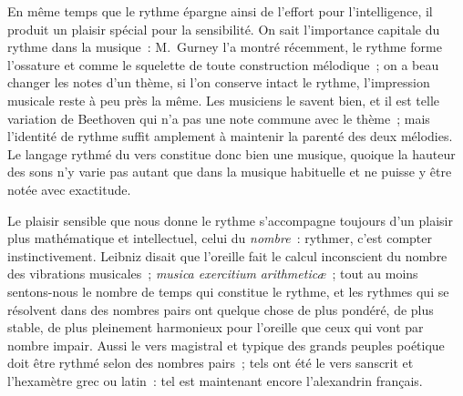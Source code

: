 \documentclass[french,twoside]{book} %
\newcommand\foreign[1]{\emph{#1}}
\begin{document}
En même temps que le rythme épargne ainsi de l’effort pour l’intelligence, il produit un plaisir spécial pour la sensibilité. On sait l’importance capitale du rythme dans la musique : M. Gurney l’a montré récemment, le rythme forme l’ossature et comme le squelette de toute construction mélodique ; on a beau changer les notes d’un thème, si l’on conserve intact le rythme, l’impression musicale reste à peu près la même. Les musiciens le savent bien, et il est telle variation de Beethoven qui n’a pas une note commune avec le thème ; mais l’identité de rythme suffit amplement à maintenir la parenté des deux mélodies. Le langage rythmé du vers constitue donc bien une musique, quoique la hauteur des sons n’y varie pas autant que dans la musique habituelle et ne puisse y être notée avec exactitude.\par
Le plaisir sensible que nous donne le rythme s’accompagne toujours d’un plaisir plus mathématique et intellectuel, celui du \emph{nombre} : rythmer, c’est compter instinctivement. Leibniz disait que l’oreille fait le calcul inconscient du nombre des vibrations musicales ; \foreign{\emph{musica exercitium}}  \foreign{\emph{arithmeticæ}} ; tout au moins sentons-nous le nombre de temps qui constitue le rythme, et les rythmes qui se résolvent dans des nombres pairs ont quelque chose de plus pondéré, de plus stable, de plus pleinement harmonieux pour l’oreille que ceux qui vont par nombre impair. Aussi le vers magistral et typique des grands peuples poétique doit être rythmé selon des nombres pairs ; tels ont été le vers sanscrit et l’hexamètre grec ou latin : tel est maintenant encore l’alexandrin français.\par
\par
\end{document}
